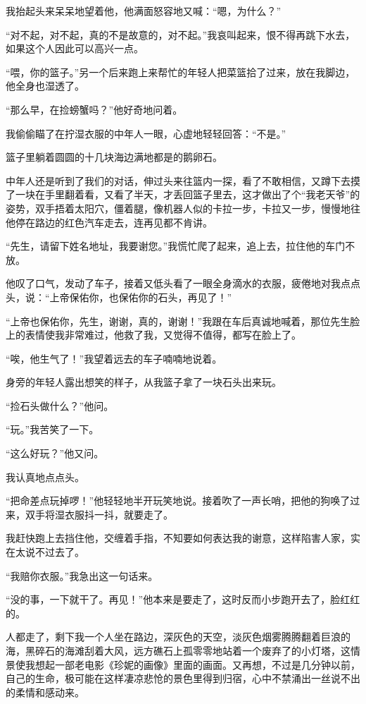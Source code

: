 \par 我抬起头来呆呆地望着他，他满面怒容地又喊：“嗯，为什么？”
\par “对不起，对不起，真的不是故意的，对不起。”我哀叫起来，恨不得再跳下水去，如果这个人因此可以高兴一点。
\par “喂，你的篮子。”另一个后来跑上来帮忙的年轻人把菜篮拾了过来，放在我脚边，他全身也湿透了。
\par “那么早，在捡螃蟹吗？”他好奇地问着。
\par 我偷偷瞄了在拧湿衣服的中年人一眼，心虚地轻轻回答：“不是。”
\par 篮子里躺着圆圆的十几块海边满地都是的鹅卵石。
\par 中年人还是听到了我们的对话，伸过头来往篮内一探，看了不敢相信，又蹲下去摸了一块在手里翻着看，又看了半天，才丢回篮子里去，这才做出了个“我老天爷”的姿势，双手捂着太阳穴，僵着腿，像机器人似的卡拉一步，卡拉又一步，慢慢地往他停在路边的红色汽车走去，连再见都不肯讲。
\par “先生，请留下姓名地址，我要谢您。”我慌忙爬了起来，追上去，拉住他的车门不放。
\par 他叹了口气，发动了车子，接着又低头看了一眼全身滴水的衣服，疲倦地对我点点头，说：“上帝保佑你，也保佑你的石头，再见了！”
\par “上帝也保佑你，先生，谢谢，真的，谢谢！”我跟在车后真诚地喊着，那位先生脸上的表情使我非常难过，他救了我，又觉得不值得，都写在脸上了。
\par “唉，他生气了！”我望着远去的车子喃喃地说着。
\par 身旁的年轻人露出想笑的样子，从我篮子拿了一块石头出来玩。
\par “捡石头做什么？”他问。
\par “玩。”我苦笑了一下。
\par “这么好玩？”他又问。
\par 我认真地点点头。
\par “把命差点玩掉啰！”他轻轻地半开玩笑地说。接着吹了一声长哨，把他的狗唤了过来，双手将湿衣服抖一抖，就要走了。
\par 我赶快跑上去挡住他，交缠着手指，不知要如何表达我的谢意，这样陷害人家，实在太说不过去了。
\par “我赔你衣服。”我急出这一句话来。
\par “没的事，一下就干了。再见！”他本来是要走了，这时反而小步跑开去了，脸红红的。
\par 人都走了，剩下我一个人坐在路边，深灰色的天空，淡灰色烟雾腾腾翻着巨浪的海，黑碎石的海滩刮着大风，远方礁石上孤零零地站着一个废弃了的小灯塔，这情景使我想起一部老电影《珍妮的画像》里面的画面。又再想，不过是几分钟以前，自己的生命，极可能在这样凄凉悲怆的景色里得到归宿，心中不禁涌出一丝说不出的柔情和感动来。
